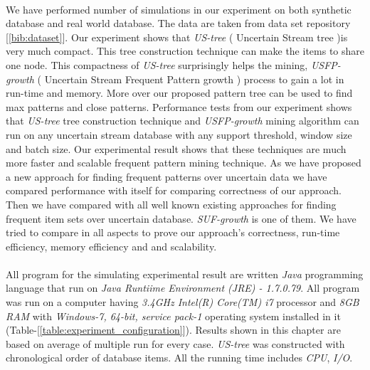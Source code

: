 %
\paragraph*{}
We have performed number of simulations in our experiment on both synthetic database and real world database. The data are taken from data set repository [\ref{bib:dataset}]. Our experiment shows that \emph{US-tree} ( Uncertain Stream tree )is very much compact. This tree construction technique can make the items to share one node. This compactness of \emph{US-tree} surprisingly helps the mining, \emph{USFP-growth} ( Uncertain Stream Frequent Pattern growth ) process to gain a lot in run-time and memory. More over our proposed pattern tree can be used to find max patterns and close patterns. Performance tests from our experiment shows that \emph{US-tree} tree construction technique and \emph{USFP-growth} mining algorithm can run on any uncertain stream database with any support threshold, window size and batch size. Our experimental result shows that these techniques are much more faster and scalable frequent pattern mining technique. As we have proposed a new approach for finding frequent patterns over uncertain data we have compared performance with itself for comparing correctness of our approach. Then we have compared with all well known existing approaches for finding frequent item sets over uncertain database. \emph{SUF-growth} is one of them. We have tried to compare in all aspects to prove our approach's correctness, run-time efficiency, memory efficiency and and scalability.
\paragraph*{}

All program for the simulating experimental result are written \emph{Java} programming language that run on \emph{Java Runtiime Environment (JRE) - 1.7.0.79}. All program was run on a computer having \emph{3.4GHz Intel(R) Core(TM) i7} processor and \emph{8GB RAM} with \emph{Windows-7, 64-bit, service pack-1} operating system installed in it (Table-[\ref{table:experiment_configuration}]). Results shown in this chapter are based on average of multiple run for every case. \emph{US-tree} was constructed with chronological order of database items. All the running time includes \emph{CPU}, \emph{I/O}.\\
